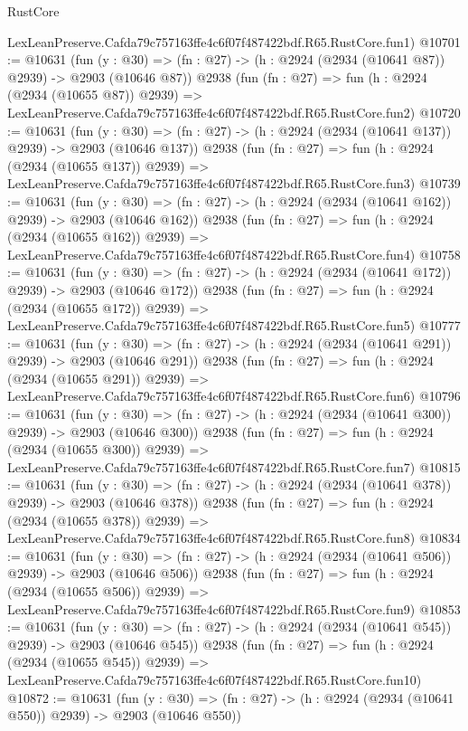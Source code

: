 \begin{lexlean}{RustCore}
\begin{coremodule}
    LexLeanPreserve.Cafda79c757163ffe4c6f07f487422bdf.R65.RustCore.fun1)
@10701 := @10631
    (fun (y : @30) => (fn : @27) -> (h : @2924 (@2934 (@10641 @87)) @2939) -> @2903 (@10646 @87))
    @2938
    (fun (fn : @27) =>
    fun (h : @2924 (@2934 (@10655 @87)) @2939) =>
    LexLeanPreserve.Cafda79c757163ffe4c6f07f487422bdf.R65.RustCore.fun2)
@10720 := @10631
    (fun (y : @30) => (fn : @27) -> (h : @2924 (@2934 (@10641 @137)) @2939) -> @2903 (@10646 @137))
    @2938
    (fun (fn : @27) =>
    fun (h : @2924 (@2934 (@10655 @137)) @2939) =>
    LexLeanPreserve.Cafda79c757163ffe4c6f07f487422bdf.R65.RustCore.fun3)
@10739 := @10631
    (fun (y : @30) => (fn : @27) -> (h : @2924 (@2934 (@10641 @162)) @2939) -> @2903 (@10646 @162))
    @2938
    (fun (fn : @27) =>
    fun (h : @2924 (@2934 (@10655 @162)) @2939) =>
    LexLeanPreserve.Cafda79c757163ffe4c6f07f487422bdf.R65.RustCore.fun4)
@10758 := @10631
    (fun (y : @30) => (fn : @27) -> (h : @2924 (@2934 (@10641 @172)) @2939) -> @2903 (@10646 @172))
    @2938
    (fun (fn : @27) =>
    fun (h : @2924 (@2934 (@10655 @172)) @2939) =>
    LexLeanPreserve.Cafda79c757163ffe4c6f07f487422bdf.R65.RustCore.fun5)
@10777 := @10631
    (fun (y : @30) => (fn : @27) -> (h : @2924 (@2934 (@10641 @291)) @2939) -> @2903 (@10646 @291))
    @2938
    (fun (fn : @27) =>
    fun (h : @2924 (@2934 (@10655 @291)) @2939) =>
    LexLeanPreserve.Cafda79c757163ffe4c6f07f487422bdf.R65.RustCore.fun6)
@10796 := @10631
    (fun (y : @30) => (fn : @27) -> (h : @2924 (@2934 (@10641 @300)) @2939) -> @2903 (@10646 @300))
    @2938
    (fun (fn : @27) =>
    fun (h : @2924 (@2934 (@10655 @300)) @2939) =>
    LexLeanPreserve.Cafda79c757163ffe4c6f07f487422bdf.R65.RustCore.fun7)
@10815 := @10631
    (fun (y : @30) => (fn : @27) -> (h : @2924 (@2934 (@10641 @378)) @2939) -> @2903 (@10646 @378))
    @2938
    (fun (fn : @27) =>
    fun (h : @2924 (@2934 (@10655 @378)) @2939) =>
    LexLeanPreserve.Cafda79c757163ffe4c6f07f487422bdf.R65.RustCore.fun8)
@10834 := @10631
    (fun (y : @30) => (fn : @27) -> (h : @2924 (@2934 (@10641 @506)) @2939) -> @2903 (@10646 @506))
    @2938
    (fun (fn : @27) =>
    fun (h : @2924 (@2934 (@10655 @506)) @2939) =>
    LexLeanPreserve.Cafda79c757163ffe4c6f07f487422bdf.R65.RustCore.fun9)
@10853 := @10631
    (fun (y : @30) => (fn : @27) -> (h : @2924 (@2934 (@10641 @545)) @2939) -> @2903 (@10646 @545))
    @2938
    (fun (fn : @27) =>
    fun (h : @2924 (@2934 (@10655 @545)) @2939) =>
    LexLeanPreserve.Cafda79c757163ffe4c6f07f487422bdf.R65.RustCore.fun10)
@10872 := @10631
    (fun (y : @30) => (fn : @27) -> (h : @2924 (@2934 (@10641 @550)) @2939) -> @2903 (@10646 @550))

\end{coremodule}
\end{lexlean}
